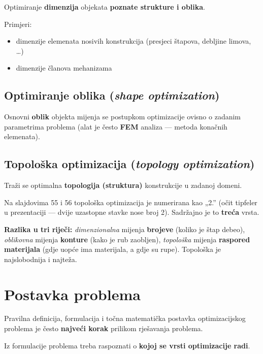 Optimiranje \textbf{dimenzija} objekata \textbf{poznate strukture i oblika}.

Primjeri:
\begin{itemize}
  \item dimenzije elemenata nosivih konstrukcija (presjeci štapova, debljine
        limova, \dots)
  \item dimenzije članova mehanizama
\end{itemize}

\subsection{Optimiranje oblika (\emph{shape optimization})}

Osnovni \textbf{oblik} objekta mijenja se postupkom optimizacije ovisno o
zadanim parametrima problema (alat je često \textbf{FEM} analiza --- metoda
konačnih elemenata).

\subsection{Topološka optimizacija (\emph{topology optimization})}

Traži se optimalna \textbf{topologija (struktura)} konstrukcije u zadanoj
domeni.

\begin{napomena}
Na slajdovima 55 i 56 topološka optimizacija je numerirana kao „2.” (očit
tipfeler u prezentaciji --- dvije uzastopne stavke nose broj 2). Sadržajno je
to \textbf{treća} vrsta.
\end{napomena}

\textbf{Razlika u tri riječi:} \emph{dimenzionalna} mijenja \textbf{brojeve}
(koliko je štap debeo), \emph{oblikovna} mijenja \textbf{konture} (kako je rub
zaobljen), \emph{topološka} mijenja \textbf{raspored materijala} (gdje uopće ima
materijala, a gdje su rupe). Topološka je najslobodnija i najteža.

\section{Postavka problema}

\begin{teorem}
Pravilna definicija, formulacija i točna matematička postavka optimizacijskog
problema je često \textbf{najveći korak} prilikom rješavanja problema.

Iz formulacije problema treba raspoznati o \textbf{kojoj se vrsti optimizacije
radi}.
\end{teorem}

